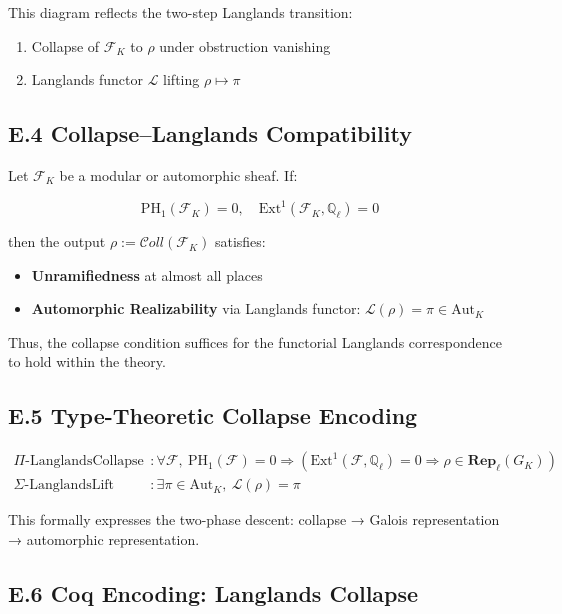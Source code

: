\documentclass[11pt]{article}
\begin{document}
This diagram reflects the two-step Langlands transition:
\begin{enumerate}
  \item Collapse of \( \mathcal{F}_K \) to \( \rho \) under obstruction vanishing
  \item Langlands functor \( \mathcal{L} \) lifting \( \rho \mapsto \pi \)
\end{enumerate}

\subsection*{E.4 Collapse–Langlands Compatibility}

Let \( \mathcal{F}_K \) be a modular or automorphic sheaf. If:

\[
\mathrm{PH}_1(\mathcal{F}_K) = 0, \quad \mathrm{Ext}^1(\mathcal{F}_K, \mathbb{Q}_\ell) = 0
\]

then the output \( \rho := \mathcal{C}oll(\mathcal{F}_K) \) satisfies:

\begin{itemize}
  \item \textbf{Unramifiedness} at almost all places
  \item \textbf{Automorphic Realizability} via Langlands functor: \( \mathcal{L}(\rho) = \pi \in \text{Aut}_K \)
\end{itemize}

Thus, the collapse condition suffices for the functorial Langlands correspondence to hold within the theory.

\subsection*{E.5 Type-Theoretic Collapse Encoding}

\begin{align*}
\Pi\text{-LanglandsCollapse} &: \forall \mathcal{F},\ \mathrm{PH}_1(\mathcal{F}) = 0 \Rightarrow \left( \mathrm{Ext}^1(\mathcal{F}, \mathbb{Q}_\ell) = 0 \Rightarrow \rho \in \mathbf{Rep}_{\ell}(G_K) \right) \\
\Sigma\text{-LanglandsLift} &: \exists \pi \in \text{Aut}_K,\ \mathcal{L}(\rho) = \pi
\end{align*}

This formally expresses the two-phase descent:  
collapse → Galois representation → automorphic representation.

\subsection*{E.6 Coq Encoding: Langlands Collapse}
\label{sec:coq-collapse-langlands}
\end{document}

